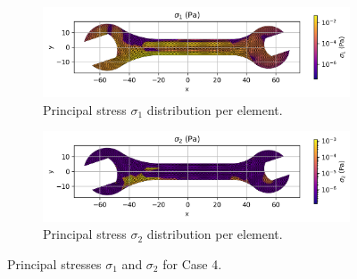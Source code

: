 \begin{figure}[H]
    \centering
    \begin{subfigure}[t]{0.49\textwidth}
        \centering
        \includegraphics[width=\textwidth]{GRAFICOS/Case d - sigma_1_per_element.png}
        \caption{Principal stress $\sigma_1$ distribution per element.}
        \label{fig:sigma_1_d}
    \end{subfigure}
    \hfill
    \begin{subfigure}[t]{0.49\textwidth}
        \centering
        \includegraphics[width=\textwidth]{GRAFICOS/Case d - sigma_2_per_element.png}
        \caption{Principal stress $\sigma_2$ distribution per element.}
        \label{fig:sigma_2_d}
    \end{subfigure}
    \caption{Principal stresses $\sigma_1$ and $\sigma_2$ for Case 4.}
    \label{fig:principal_stresses_d}
\end{figure}

